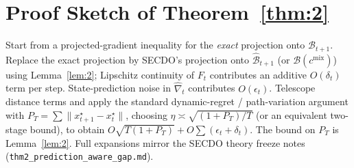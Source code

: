 \section{Proof Sketch of Theorem~\ref{thm:2}}
\label{app:thm2}

Start from a projected-gradient inequality for the \emph{exact} projection onto $\mathcal{B}_{t+1}$.
Replace the exact projection by SECDO's projection onto $\hat{\mathcal{B}}_{t+1}$ (or $\mathcal{B}(c^{\mathrm{mix}})$) using Lemma~\ref{lem:2}; Lipschitz continuity of $F_t$ contributes an additive $O(\delta_t)$ term per step.
State-prediction noise in $\widehat{\nabla}_t$ contributes $O(\epsilon_t)$.
Telescope distance terms and apply the standard dynamic-regret / path-variation argument with $P_T=\sum\|x_{t+1}^\star-x_t^\star\|$, choosing $\eta\asymp\sqrt{(1+P_T)/T}$ (or an equivalent two-stage bound), to obtain
$O\sqrt{T(1+P_T)}+O\sum(\epsilon_t+\delta_t)$.
The bound on $P_T$ is Lemma~\ref{lem:2}.
Full expansions mirror the SECDO theory freeze notes (\texttt{thm2\_prediction\_aware\_gap.md}).

